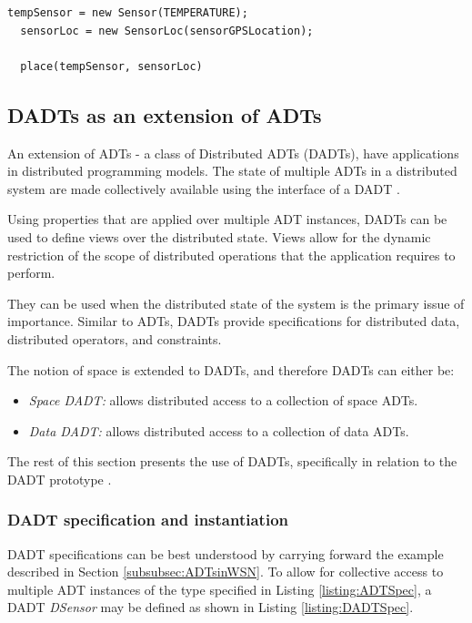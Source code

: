 \begin{lstlisting}[frame=trbl, basewidth={0.55em, 0.6em}, captionpos=b, basicstyle=\ttfamily\footnotesize, breaklines, caption = ADT placement, label = listing:placement ]
  tempSensor = new Sensor(TEMPERATURE);
  sensorLoc = new SensorLoc(sensorGPSLocation);
  
  place(tempSensor, sensorLoc)
\end{lstlisting}

\subsection{DADTs as an extension of ADTs}
An extension of ADTs - a class of Distributed ADTs (DADTs), have applications 
in distributed programming models. The state of multiple ADTs in a distributed
system are made collectively available using the interface of a DADT
\cite{migliavacca_DADT:2006}. 

Using properties that are applied over multiple ADT instances, DADTs can be
used to define views over the distributed state. Views allow for the dynamic
restriction of the scope of distributed operations that the application
requires to perform. 

They can be used when the distributed state 
of the system is the primary issue of importance. Similar to ADTs, DADTs 
provide specifications for distributed data, distributed operators, and 
constraints.

The notion of space is extended to DADTs, and therefore DADTs can either be:

\begin{itemize}
  \item \emph{Space DADT:} allows distributed access to a collection of space
  ADTs. 
  \item \emph{Data DADT:} allows distributed access to a collection of data ADTs.
\end{itemize}

The rest of this section presents the use of DADTs, specifically in relation to
the DADT prototype \cite{migliavacca_DADT:2006}.

\subsubsection{DADT specification and instantiation}

DADT specifications can be best understood by carrying forward the example
described in Section \ref{subsubsec:ADTsinWSN}. To allow for collective access
to multiple ADT instances of the type specified in Listing
\ref{listing:ADTSpec}, a DADT \emph{DSensor} may be defined as shown in Listing
\ref{listing:DADTSpec}.   
 
